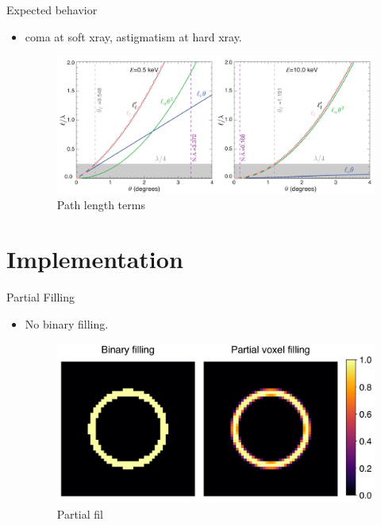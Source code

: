 \documentclass{beamer}
\begin{document}
\begin{frame}{Expected behavior}
	\begin{itemize}
		\item coma at soft xray, astigmatism at hard xray.
		\begin{center}
			\begin{figure}
				\includegraphics[scale=0.3]{path_length_terms}
				\caption{Path length terms}	
			\end{figure}
		\end{center}
	\end{itemize}
\end{frame}


\section{Implementation}
\begin{frame}{Partial Filling}
	\begin{itemize}
		\item No binary filling.
		\begin{center}
			\begin{figure}
				\includegraphics[scale=0.3]{partial_fill}
				\caption{Partial fil}	
			\end{figure}
		\end{center}
	\end{itemize}
\end{frame}
\end{document}
